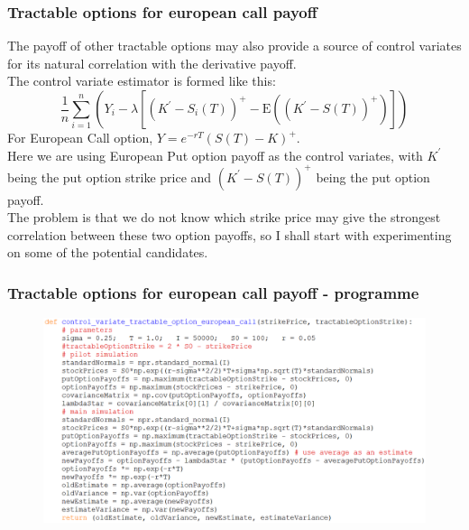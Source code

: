 \documentclass{beamer}
\begin{document}
\begin{frame}
\frametitle{Tractable options for european call payoff}
The payoff of other tractable options may also provide a source of control variates for its natural correlation with the derivative payoff.\\
The control variate estimator is formed like this:
$$ \frac{1}{n}\sum_{i=1}^{n}(Y_{i}-\lambda[(K^{\prime}-S_{i}(T))^{+}-\mathrm{E}((K^{\prime}-S(T))^{+})])$$
For European Call option, $Y = e^{-rT}(S(T)-K)^{+}$.\\
Here we are using European Put option payoff as the control variates, with $K^{\prime}$ being the put option strike price and $(K^{\prime}-S(T))^{+}$ being the put option payoff.\\ The problem is that we do not know which strike price may give the strongest correlation between these two option payoffs, so I shall start with experimenting on some of the potential candidates.
\end{frame}

\begin{frame}
\frametitle{Tractable options for european call payoff - programme}
\begin{figure}[H]
	\includegraphics[scale=0.36]{control_variate_european_call_put_option.png}
\end{figure}
\end{frame}
\end{document}
